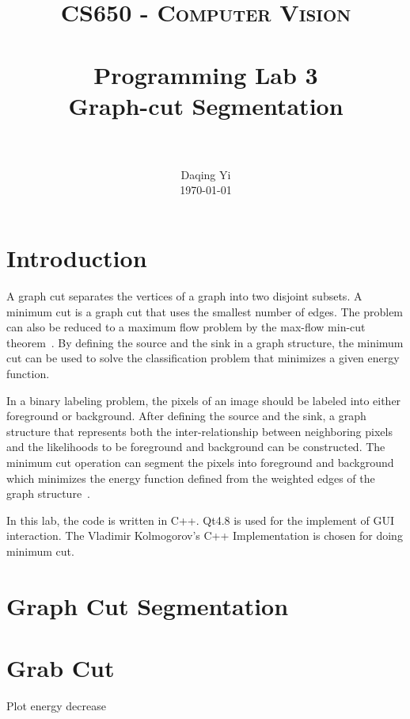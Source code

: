 \documentclass[paper=a4, fontsize=11pt]{scrartcl}
\title{
		\usefont{OT1}{bch}{b}{n}
		\normalfont \normalsize \textsc{CS650 - Computer Vision} \\ [25pt]
		\horrule{0.5pt} \\[0.4cm]
		\huge Programming Lab 3 \\ Graph-cut Segmentation \\
		\horrule{2pt} \\[0.5cm]
}
\author{
		\normalfont 								\normalsize
        Daqing Yi\\[-3pt]		\normalsize
        \today
}
\date{}
\begin{document}
\maketitle

\section{Introduction}

A graph cut separates the vertices of a graph into two disjoint subsets.
A minimum cut is a graph cut that uses the smallest number of edges.
The problem can also be reduced to a maximum flow problem by the max-flow min-cut theorem~\cite{wiki:Max-flow_min-cut_theorem}.
By defining the source and the sink in a graph structure, the minimum cut can be used to solve the classification problem that minimizes a given energy function.

In a binary labeling problem, the pixels of an image should be labeled into either foreground or background.
After defining the source and the sink, a graph structure that represents both the inter-relationship between neighboring pixels and the likelihoods to be foreground and background can be constructed.
The minimum cut operation can segment the pixels into foreground and background which minimizes the energy function defined from the weighted edges of the graph structure~\cite{937505}.

In this lab, the code is written in C++.
Qt4.8 is used for the implement of GUI interaction.
The Vladimir Kolmogorov's C++ Implementation is chosen for doing minimum cut.

\section{Graph Cut Segmentation}


\section{Grab Cut}

Plot energy decrease

\begin{comment}
As before, prepare a write-up that describes your work.  Show examples of your code applied to different images.  What kinds of images does graph-cut segmentation (or Grab Cut respectively) work well for? What kinds of images do you find it struggles with? 
\end{comment}




\end{document}
